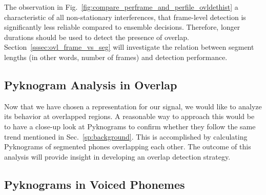 {The observation in Fig.~\ref{fig:compare_perframe_and_perfile_ovldethist} a characteristic of all non-stationary interferences, that frame-level detection is significantly less reliable compared to ensemble decisions. 
Therefore, longer durations should be used to detect the presence of overlap. 
Section~\ref{sssec:ovl_frame_vs_seg} will investigate the relation between segment lengths (in other words, number of frames) and detection performance. 


\subsection{Pyknogram Analysis in Overlap}

Now that we have chosen a representation for our signal, we would like to analyze its behavior at overlapped regions. 
A reasonable way to approach this would be to have a close-up look at Pyknograms to confirm whether they follow the same trend mentioned in Sec.~\ref{sp:background}. 
This is accomplished by calculating Pyknograms of segmented phones overlapping each other. 
The outcome of this analysis will provide insight in developing an overlap detection strategy. 

\subsection{Pyknograms in Voiced Phonemes}

}

